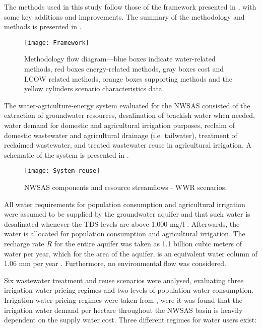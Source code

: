 The methods used in this study follow those of the framework presented in \cite{ramirezgomezTechnoeconomicGISbasedModel2018}, with some key additions and improvements. The summary of the methodology and methods is presented in .

\begin{figure*}[!h]
	\centering
	\texttt{[image: Framework]}
	\caption{Methodology flow diagram---blue boxes indicate water-related methods, red boxes energy-related methods, gray boxes cost and LCOW related methods, orange boxes supporting methods and the yellow cylinders scenario characteristics data.}
	\label{fig:framework}
\end{figure*}

The water-agriculture-energy system evaluated for the NWSAS consisted of the extraction of groundwater resources, desalination of brackish water when needed, water demand for domestic and agricultural irrigation purposes, reclaim of domestic wastewater and agricultural drainage (i.e. tailwater), treatment of reclaimed wastewater, and treated wastewater reuse in agricultural irrigation. A schematic of the system is presented in .

\begin{figure*}[!h]
	\centering
	\texttt{[image: System\_reuse]}
	\caption{NWSAS components and resource streamflows - WWR scenarios.}
	\label{fig:system_reuse}
\end{figure*}

All water requirements for population consumption and agricultural irrigation were assumed to be supplied by the groundwater aquifer and that such water is desalinated whenever the TDS levels are above 1,000 mg/l \cite{fao1985water}. Afterwards, the water is allocated for population consumption and agricultural irrigation. 
The recharge rate $R$ for the entire aquifer was taken as 1.1 billion cubic meters of water per year, which for the area of the aquifer, is an equivalent water column of 1.06 mm per year \cite{BetterValorizationIrrigation2015}. Furthermore, no environmental flow was considered.

Six wastewater treatment and reuse scenarios were analysed, evaluating three irrigation water pricing regimes and two levels of population water consumption. Irrigation water pricing regimes were taken from \cite{Socioeconomicaspectsirrigation2014}, were it was found that the irrigation water demand per hectare throughout the NWSAS basin is heavily dependent on the supply water cost. Three different regimes for water users exist: 

